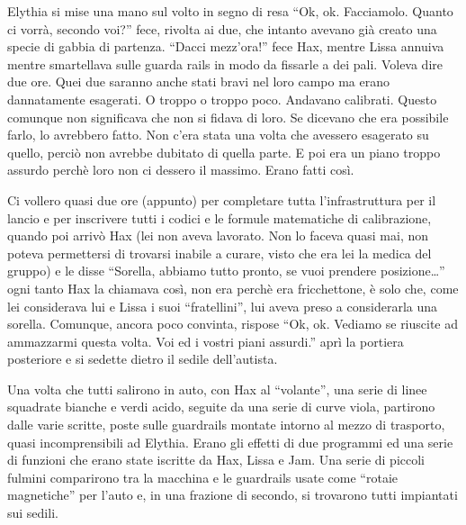     Elythia si mise una mano sul volto in segno di resa ``Ok, ok.
    Facciamolo. Quanto ci vorrà, secondo voi?'' fece, rivolta ai due, che
    intanto avevano già creato una specie di gabbia di partenza. ``Dacci
    mezz'ora!'' fece Hax, mentre Lissa annuiva mentre smartellava sulle
    guarda rails in modo da fissarle a dei pali. Voleva dire due ore. Quei
    due saranno anche stati bravi nel loro campo ma erano dannatamente
    esagerati. O troppo o troppo poco. Andavano calibrati. Questo comunque
    non significava che non si fidava di loro. Se dicevano che era
    possibile farlo, lo avrebbero fatto. Non c'era stata una volta che
    avessero esagerato su quello, perciò non avrebbe dubitato di quella
    parte. E poi era un piano troppo assurdo perchè loro non ci dessero il
    massimo. Erano fatti così.

    Ci vollero quasi due ore (appunto) per completare tutta
    l'infrastruttura per il lancio e per inscrivere tutti i codici e le
    formule matematiche di calibrazione, quando poi arrivò Hax (lei non
    aveva lavorato. Non lo faceva quasi mai, non poteva permettersi di
    trovarsi inabile a curare, visto che era lei la medica del gruppo) e le
    disse ``Sorella, abbiamo tutto pronto, se vuoi prendere
    posizione\dots{}'' ogni tanto Hax la chiamava così, non era perchè era
    fricchettone, è solo che, come lei considerava lui e Lissa i suoi
    ``fratellini'', lui aveva preso a considerarla una sorella. Comunque,
    ancora poco convinta, rispose ``Ok, ok. Vediamo se riuscite ad
    ammazzarmi questa volta. Voi ed i vostri piani assurdi.'' aprì la
    portiera posteriore e si sedette dietro il sedile dell'autista.

    Una volta che tutti salirono in auto, con Hax al ``volante'', una serie
    di linee squadrate bianche e verdi acido, seguite da una serie di curve
    viola, partirono dalle varie scritte, poste sulle guardrails montate
    intorno al mezzo di trasporto, quasi incomprensibili ad Elythia. Erano
    gli effetti di due programmi ed una serie di funzioni che erano state
    iscritte da Hax, Lissa e Jam. Una serie di piccoli fulmini comparirono
    tra la macchina e le guardrails usate come ``rotaie magnetiche'' per
    l'auto e, in una frazione di secondo, si trovarono tutti impiantati sui
    sedili.

